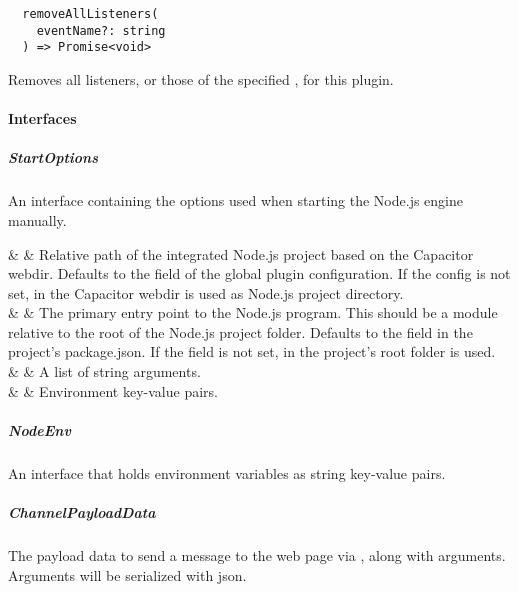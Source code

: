 \begin{verbatim}
  removeAllListeners(
    eventName?: string
  ) => Promise<void>
\end{verbatim}

Removes all listeners, or those of the specified , for this plugin.


\newpage

\paragraph{Interfaces}


\subparagraph{StartOptions}

An interface containing the options used when starting the Node.js engine manually.

\begin{interfacedesc}
   &    & Relative path of the integrated Node.js project based on the Capacitor webdir. Defaults to the  field of the global plugin configuration. If the  config is not set,  in the Capacitor webdir is used as Node.js project directory. \\ \hline
    &    & The primary entry point to the Node.js program. This should be a module relative to the root of the Node.js project folder. Defaults to the  field in the project's package.json. If the  field is not set,  in the project's root folder is used. \\ \hline
      &  & A list of string arguments. \\ \hline
       &   & Environment key-value pairs. \\ \hline
\end{interfacedesc}


\subparagraph{NodeEnv}

An interface that holds environment variables as string key-value pairs.


\subparagraph{ChannelPayloadData}

The payload data to send a message to the web page via ,
along with arguments. Arguments will be serialized with \ac{json}.

